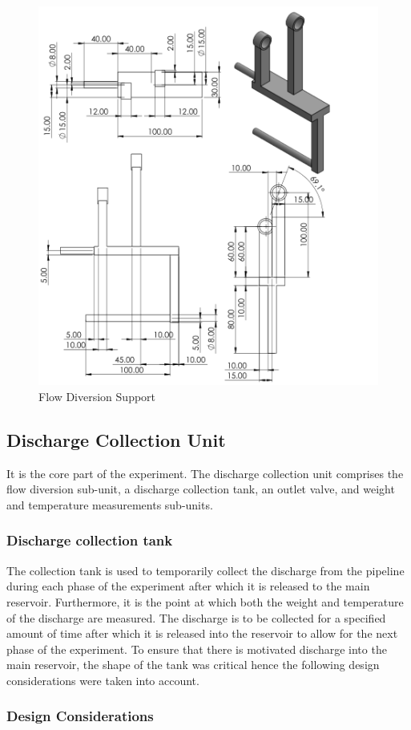 \begin{figure}[H]
\includegraphics[width=0.7\linewidth]{Figures/ssholder.png}
\centering
\caption{Flow Diversion Support }
\label{fig:ssholder}
\end{figure}


\clearpage

\subsection{Discharge Collection Unit}
It is the core part of the experiment. The discharge collection unit comprises the flow diversion sub-unit, a discharge collection tank, an outlet valve, and weight and temperature measurements sub-units.
\subsubsection{Discharge collection tank}
The collection tank is used to temporarily collect the discharge from the pipeline during each phase of the experiment after which it is released to the main reservoir. Furthermore, it is the point at which both the weight and temperature of the discharge are measured. The discharge is to be collected for a specified amount of time after which it is released into the reservoir to allow for the next phase of the experiment. To ensure that there is motivated discharge into the main reservoir, the shape of the tank was critical hence the following design considerations were taken into account.
\subsubsection{Design Considerations}
